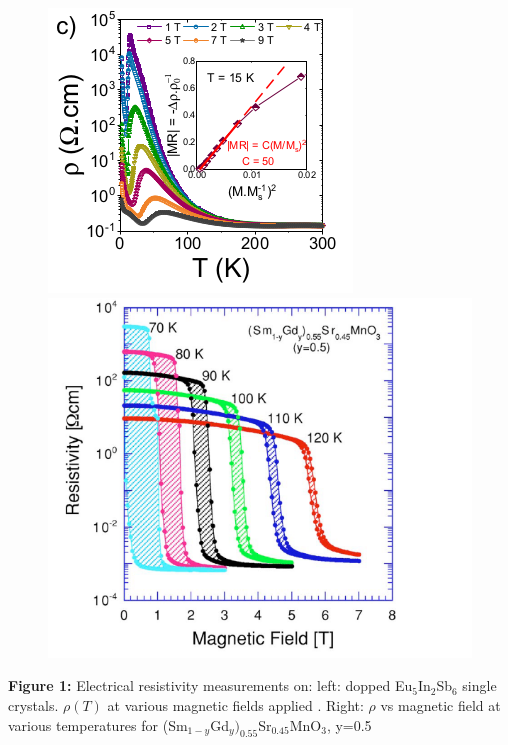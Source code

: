 \documentclass[12pt,twoside]{report}
\begin{document}
	\begin{center}
\begin{figure}[h!]
\hspace{1cm}
	\begin{minipage}{0.4\textwidth}
		\includegraphics[scale=0.48]{i1.png}
	\end{minipage}
	\hspace{2.5cm}
		\begin{minipage}{0.4\textwidth}
			\includegraphics[scale=0.25]{i2.png}
		\end{minipage}
\end{figure}
{\bf Figure 1:} Electrical resistivity measurements on: left: dopped Eu$_5$In$_2$Sb$_6$ single crystals. $\rho(T)$ at various magnetic fields applied \cite{1JD}. Right: $\rho$ vs magnetic field at various temperatures for (Sm$_{1-y}$Gd$_y)_{0.55}$Sr$_{0.45}$MnO$_3$, y=0.5 \cite{2JD}
\end{center}
\end{document}
